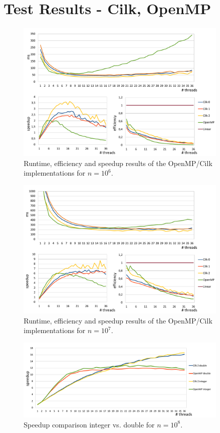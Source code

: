 \documentclass[12pt,a4paper]{article}
\begin{document}
\section{Test Results - Cilk, OpenMP}
\begin{figure}[h]
	\includegraphics[width=0.9\textwidth]{img/omp_cilk_1mil.pdf}
	\caption{Runtime, efficiency and speedup results of the OpenMP/Cilk implementations for $n=10^{6}$.}
\end{figure}
\begin{figure}[h]
	\includegraphics[width=0.9\textwidth]{img/omp_cilk_10mil.pdf}
	\caption{Runtime, efficiency and speedup results of the OpenMP/Cilk implementations for $n=10^{7}$.}
\end{figure}
\begin{figure}[h]
	\includegraphics[width=0.9\textwidth]{img/omp_cilk_double_comparison_100mil.pdf}
	\caption{Speedup comparison integer vs. double for $n=10^{8}$.}
\end{figure}
\end{document}
